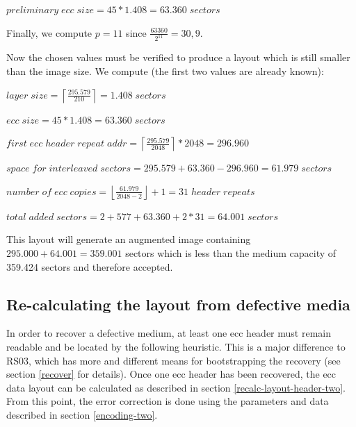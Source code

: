\smallskip

$preliminary\; ecc\; size = 45 * 1.408 = 63.360\; sectors$

\bigskip

Finally, we compute $p = 11$ since $\frac{63360}{2^{11}} = 30,9$.

\bigskip

Now the chosen values must be verified to produce a layout which is
still smaller than the image size. We compute (the first two values are already known):

\medskip

$layer\; size = \left\lceil\frac{295.579}{210}\right\rceil = 1.408\; sectors$

\smallskip

$ecc\; size = 45 * 1.408 = 63.360\; sectors$

\smallskip

$first\; ecc\; header\; repeat\; addr = \left\lceil\frac{295.579}{2048}\right\rceil * 2048 = 296.960$

\smallskip 

$space\; for\; interleaved\; sectors = 295.579 + 63.360 - 296.960 = 61.979\; sectors$

\smallskip

$number\; of\; ecc\; copies = \left\lfloor\frac{61.979}{2048-2}\right\rfloor + 1 = 31\; header\; repeats$

\smallskip

$total\; added\; sectors = 2 + 577 + 63.360 + 2 * 31 = 64.001\; sectors$

\medskip

This layout will generate an augmented image containing
$295.000 + 64.001 = 359.001$ sectors which is 
less than the medium capacity of 359.424 sectors
and therefore accepted.

\subsection{Re-calculating the layout from defective media}
\label{search-two}

In order to recover a defective medium, at least one ecc header must
remain readable and be located by the following heuristic. This
is a major difference to RS03, which has more and different means
for bootstrapping the recovery (see section \ref{recover} for details).
Once one ecc header has been recovered, the ecc data layout can be
calculated as described in section \ref{recalc-layout-header-two}.
From this point, the error correction is done using the parameters
and data described in section \ref{encoding-two}.

